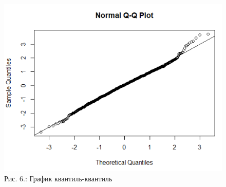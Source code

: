 \documentclass[
  letterpaper,
  DIV=11,
  numbers=noendperiod]{scrreprt}
\begin{document}
\begin{figure}[H]

{\centering \includegraphics[width=0.6\linewidth,height=\textheight,keepaspectratio]{images/sdmTMB6.PNG}

}

\caption{Рис. 6.: График квантиль-квантиль}

\end{figure}%
\end{document}
